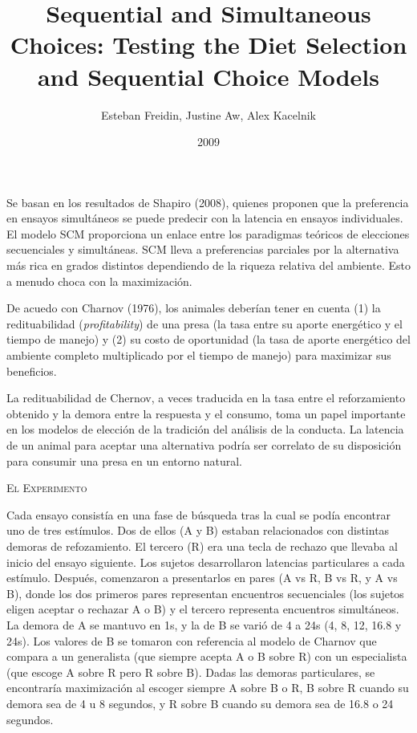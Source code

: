 \documentclass[a4paper,12pt]{article}
\title{Sequential and Simultaneous Choices: Testing the Diet Selection and Sequential Choice Models}
\author{Esteban Freidin, Justine Aw, Alex Kacelnik}
\date{2009}
\begin{document}
{\scshape\bfseries\maketitle}

Se basan en los resultados de Shapiro (2008), quienes proponen que la preferencia en ensayos simultáneos se puede predecir con la latencia en ensayos individuales. El modelo SCM proporciona un enlace entre los paradigmas teóricos de elecciones secuenciales y simultáneas. SCM lleva a preferencias parciales por la alternativa más rica en grados distintos dependiendo de la riqueza relativa del ambiente. Esto a menudo choca con la maximización.

De acuedo con Charnov (1976), los animales deberían tener en cuenta (1) la redituabilidad ({\slshape profitability}) de una presa (la tasa entre su aporte energético y el tiempo de manejo) y (2) su costo de oportunidad (la tasa de aporte energético del ambiente completo multiplicado por el tiempo de manejo) para maximizar sus beneficios.

La redituabilidad de Chernov, a veces traducida en la tasa entre el reforzamiento obtenido y la demora entre la respuesta y el consumo, toma un papel importante en los modelos de elección de la tradición del análisis de la conducta. La latencia de un animal para aceptar una alternativa podría ser correlato de su disposición para consumir una presa en un entorno natural.

{\scshape El Experimento}

Cada ensayo consistía en una fase de búsqueda tras la cual se podía encontrar uno de tres estímulos. Dos de ellos (A y B) estaban relacionados con distintas demoras de refozamiento. El tercero (R) era una tecla de rechazo que llevaba al inicio del ensayo siguiente. Los sujetos desarrollaron latencias particulares a cada estímulo. Después, comenzaron a presentarlos en pares (A vs R, B vs R, y A vs B), donde los dos primeros pares representan encuentros secuenciales (los sujetos eligen aceptar o rechazar A o B) y el tercero representa encuentros simultáneos. La demora de A se mantuvo en 1s, y la de B se varió de 4 a 24s (4, 8, 12, 16.8 y 24s). Los valores de B se tomaron con referencia al modelo de Charnov que compara a un generalista (que siempre acepta A o B sobre R) con un especialista (que escoge A sobre R pero R sobre B). Dadas las demoras particulares, se encontraría maximización al escoger siempre A sobre B o R, B sobre R cuando su demora sea de 4 u 8 segundos, y R sobre B cuando su demora sea de 16.8 o 24 segundos.
\end{document}
